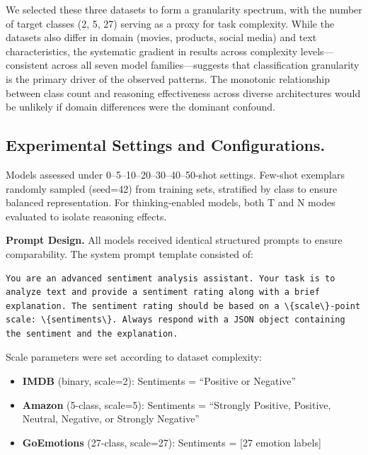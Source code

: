 \documentclass[runningheads]{llncs}
\begin{document}
We selected these three datasets to form a granularity spectrum, with the number of target classes (2, 5, 27) serving as a proxy for task complexity. While the datasets also differ in domain (movies, products, social media) and text characteristics, the systematic gradient in results across complexity levels---consistent across all seven model families---suggests that classification granularity is the primary driver of the observed patterns. The monotonic relationship between class count and reasoning effectiveness across diverse architectures would be unlikely if domain differences were the dominant confound.

\subsection{Experimental Settings and Configurations.} Models assessed under 0--5--10--20--30--40--50-shot settings. Few-shot exemplars randomly sampled (seed=42) from training sets, stratified by class to ensure balanced representation. For thinking-enabled models, both T and N modes evaluated to isolate reasoning effects.

\textbf{Prompt Design.} All models received identical structured prompts to ensure comparability. The system prompt template consisted of:

\begin{verbatim}   
You are an advanced sentiment analysis assistant. Your task is to analyze text and provide a sentiment rating along with a brief explanation. The sentiment rating should be based on a \{scale\}-point scale: \{sentiments\}. Always respond with a JSON object containing the sentiment and the explanation.
\end{verbatim}

Scale parameters were set according to dataset complexity:
\begin{itemize}[leftmargin=*,itemsep=1pt]
\item \textbf{IMDB} (binary, scale=2): Sentiments = ``Positive or Negative''
\item \textbf{Amazon} (5-class, scale=5): Sentiments = ``Strongly Positive, Positive, Neutral, Negative, or Strongly Negative''
\item \textbf{GoEmotions} (27-class, scale=27): Sentiments = [27 emotion labels]
\end{itemize}
\end{document}
